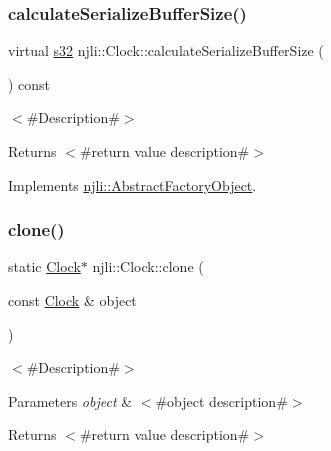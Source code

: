 \subsubsection{\texorpdfstring{calculate\+Serialize\+Buffer\+Size()}{calculateSerializeBufferSize()}}
{\footnotesize\ttfamily virtual \mbox{\hyperlink{_util_8h_aa62c75d314a0d1f37f79c4b73b2292e2}{s32}} njli\+::\+Clock\+::calculate\+Serialize\+Buffer\+Size (\begin{DoxyParamCaption}{ }\end{DoxyParamCaption}) const\hspace{0.3cm}{\ttfamily [virtual]}}

$<$\#\+Description\#$>$

\begin{DoxyReturn}{Returns}
$<$\#return value description\#$>$ 
\end{DoxyReturn}


Implements \mbox{\hyperlink{classnjli_1_1_abstract_factory_object_a4763d05bc9dc37c559111f8bb30e1dd8}{njli\+::\+Abstract\+Factory\+Object}}.

\mbox{\label{classnjli_1_1_clock_af5238b0b80730c0b42194fe8c5b3cc07}} 
\subsubsection{\texorpdfstring{clone()}{clone()}}
{\footnotesize\ttfamily static \mbox{\hyperlink{classnjli_1_1_clock}{Clock}}$\ast$ njli\+::\+Clock\+::clone (\begin{DoxyParamCaption}\item[{const \mbox{\hyperlink{classnjli_1_1_clock}{Clock}} \&}]{object }\end{DoxyParamCaption})\hspace{0.3cm}{\ttfamily [static]}}

$<$\#\+Description\#$>$


\begin{DoxyParams}{Parameters}
{\em object} & $<$\#object description\#$>$\\
\hline
\end{DoxyParams}
\begin{DoxyReturn}{Returns}
$<$\#return value description\#$>$ 
\end{DoxyReturn}
\mbox{\label{classnjli_1_1_clock_a6b20a66ca32c33acce1edebaf5ac0420}} 
